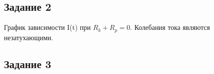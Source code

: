 \documentclass[a4paper,oneside,12pt]{extreport}
\begin{document}
\begin{figure}[ht!]
\end{figure}

\newpage
\subsection{Задание 2}

График зависимости I(t) при $R_k + R_p = 0$. 
Колебания тока являются незатухающими.
\begin{figure}[ht!]
\end{figure}

\subsection{Задание 3}
\end{document}
